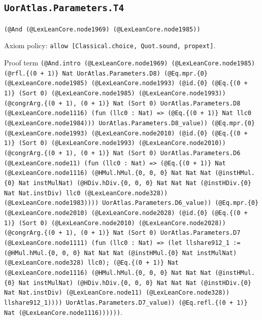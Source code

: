 \documentclass[11pt]{article}
\begin{document}
\subsection*{\texttt{UorAtlas.Parameters.T4}}
\noindent\texttt{(@And (@LexLeanCore.node1969) (@LexLeanCore.node1985))}\par
\noindent Axiom policy: \texttt{allow [Classical.choice, Quot.sound, propext]}.\par
\noindent Proof term \texttt{(@And.intro (@LexLeanCore.node1969) (@LexLeanCore.node1985) (@rfl.\{(0 + 1)\} Nat UorAtlas.Parameters.D8) (@Eq.mpr.\{0\} (@LexLeanCore.node1985) (@LexLeanCore.node1993) (@id.\{0\} (@Eq.\{(0 + 1)\} (Sort 0) (@LexLeanCore.node1985) (@LexLeanCore.node1993)) (@congrArg.\{(0 + 1), (0 + 1)\} Nat (Sort 0) UorAtlas.Parameters.D8 (@LexLeanCore.node1116) (fun (llc0 : Nat) => (@Eq.\{(0 + 1)\} Nat llc0 (@LexLeanCore.node1984))) UorAtlas.Parameters.D8\_value)) (@Eq.mpr.\{0\} (@LexLeanCore.node1993) (@LexLeanCore.node2010) (@id.\{0\} (@Eq.\{(0 + 1)\} (Sort 0) (@LexLeanCore.node1993) (@LexLeanCore.node2010)) (@congrArg.\{(0 + 1), (0 + 1)\} Nat (Sort 0) UorAtlas.Parameters.D6 (@LexLeanCore.node11) (fun (llc0 : Nat) => (@Eq.\{(0 + 1)\} Nat (@LexLeanCore.node1116) (@HMul.hMul.\{0, 0, 0\} Nat Nat Nat (@instHMul.\{0\} Nat instMulNat) (@HDiv.hDiv.\{0, 0, 0\} Nat Nat Nat (@instHDiv.\{0\} Nat Nat.instDiv) llc0 (@LexLeanCore.node328)) (@LexLeanCore.node1983)))) UorAtlas.Parameters.D6\_value)) (@Eq.mpr.\{0\} (@LexLeanCore.node2010) (@LexLeanCore.node2028) (@id.\{0\} (@Eq.\{(0 + 1)\} (Sort 0) (@LexLeanCore.node2010) (@LexLeanCore.node2028)) (@congrArg.\{(0 + 1), (0 + 1)\} Nat (Sort 0) UorAtlas.Parameters.D7 (@LexLeanCore.node1111) (fun (llc0 : Nat) => (let llshare912\_1 := (@HMul.hMul.\{0, 0, 0\} Nat Nat Nat (@instHMul.\{0\} Nat instMulNat) (@LexLeanCore.node328) llc0); (@Eq.\{(0 + 1)\} Nat (@LexLeanCore.node1116) (@HMul.hMul.\{0, 0, 0\} Nat Nat Nat (@instHMul.\{0\} Nat instMulNat) (@HDiv.hDiv.\{0, 0, 0\} Nat Nat Nat (@instHDiv.\{0\} Nat Nat.instDiv) (@LexLeanCore.node11) (@LexLeanCore.node328)) llshare912\_1)))) UorAtlas.Parameters.D7\_value)) (@Eq.refl.\{(0 + 1)\} Nat (@LexLeanCore.node1116))))))}.\par
\end{document}
